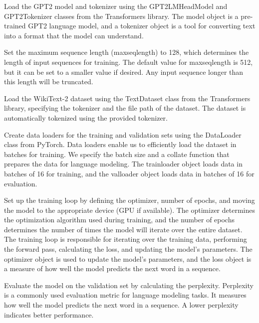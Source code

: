 \documentclass{article}
\begin{document}
Load the GPT2 model and tokenizer using the GPT2LMHeadModel and GPT2Tokenizer classes from the Transformers library. The model object is a pre-trained GPT2 language model, and a tokenizer object is a tool for converting text into a format that the model can understand.

\medskip

Set the maximum sequence length (max\textunderscore seq\textunderscore length) to 128, which determines the length of input sequences for training. The default value for max\textunderscore seq\textunderscore length is 512, but it can be set to a smaller value if desired. Any input sequence longer than this length will be truncated. 

\medskip

Load the WikiText-2 dataset using the TextDataset class from the Transformers library, specifying the tokenizer and the file path of the dataset. The dataset is automatically tokenized using the provided tokenizer.

\medskip

Create data loaders for the training and validation sets using the DataLoader class from PyTorch. Data loaders enable us to efficiently load the dataset in batches for training. We specify the batch size and a collate function that prepares the data for language modeling. The train\textunderscore loader object loads data in batches of 16 for training, and the val\textunderscore loader object loads data in batches of 16 for evaluation. 

\medskip

Set up the training loop by defining the optimizer, number of epochs, and moving the model to the appropriate device (GPU if available). The optimizer determines the optimization algorithm used during training, and the number of epochs determines the number of times the model will iterate over the entire dataset. The training loop is responsible for iterating over the training data, performing the forward pass, calculating the loss, and updating the model's parameters. The optimizer object is used to update the model's parameters, and the loss object is a measure of how well the model predicts the next word in a sequence.

\medskip

Evaluate the model on the validation set by calculating the perplexity. Perplexity is a commonly used evaluation metric for language modeling tasks. It measures how well the model predicts the next word in a sequence. A lower perplexity indicates better performance.
\end{document}

